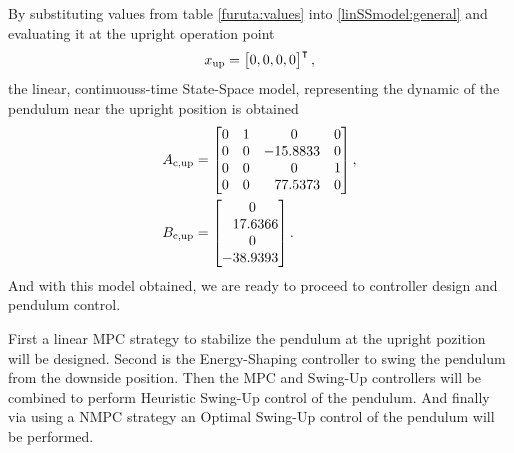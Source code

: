 By substituting values from table \ref{furuta:values} into \ref{linSSmodel:general} and evaluating it at the upright operation point 
\begin{equation}
x _{\text{up}} = \begin{bmatrix}0,0,0,0\end{bmatrix}^\intercal, 
\end{equation}
the linear, continuouss-time State-Space model, representing the dynamic of the pendulum near the upright position is obtained
\begin{subequations}\label{linSSmodel:up}
	\begin{align}
	A _{\text{c,up}} &=\begin{bmatrix}
	0&1&\ 0& 0\\
	0&0&-15.8833&0\\
	0&0&\ 0&1\\
	0&0&\ \; \,77.5373&0
	\end{bmatrix},\\
	B _{\text{c,up}} &=\begin{bmatrix}
	\ 0\\
	\ \; \,17.6366\\
	\ 0\\
	-38.9393
	\end{bmatrix}.
	\end{align}
\end{subequations}
And with this model obtained, we are ready to proceed to controller design and pendulum control.
 
First a linear MPC strategy to stabilize the pendulum at the upright pozition will be designed. Second is the Energy-Shaping controller to swing the pendulum from the downside position. Then the MPC and Swing-Up controllers will be combined to perform Heuristic Swing-Up control of the pendulum. And finally via using a NMPC strategy an Optimal Swing-Up control of the pendulum will be performed.
